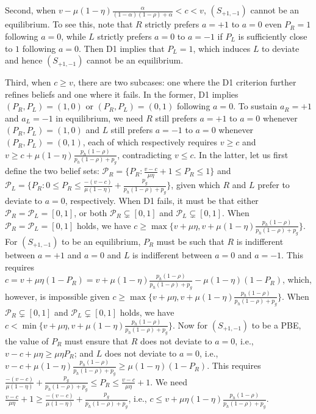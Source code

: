 \documentclass[english,12pt]{article}
\theoremstyle{plain}
\theoremstyle{plain}
\theoremstyle{definition}
\theoremstyle{definition}
\theoremstyle{assumption}
\theoremstyle{plain}
\theoremstyle{plain}
\theoremstyle{plain}
\theoremstyle{plain}
\theoremstyle{definition}%
\theoremstyle{plain}
\theoremstyle{plain}
\theoremstyle{plain}
\theoremstyle{plain}
\theoremstyle{plain}
\theoremstyle{plain}
\begin{document}
Second, when $v-\mu(1-\eta)\frac{\alpha}{(1-\alpha)(1-\rho)+\alpha}<c< v$, $(S_{+1,-1})$ cannot be an equilibrium. To see this, note that $R$ strictly prefers $a=+1$ to $a=0$ even $P_R=1$ following $a=0$, while $L$ strictly prefers $a=0$ to $a=-1$ if $P_L$ is sufficiently close to $1$ following $a=0$. Then D1 implies that $P_L=1$, which induces $L$ to deviate and hence $(S_{+1,-1})$ cannot be an equilibrium. 

Third, when $c\geq v$, there are two subcases: one where the D1 criterion further refines beliefs and one where it fails. In the former, D1 implies $(P_R,P_L)=(1,0)$ or $(P_R,P_L)=(0,1)$ following $a=0$. To sustain $a_R=+1$ and $a_L=-1$ in equilibrium, we need $R$ still prefers $a=+1$ to $a=0$ whenever $(P_R,P_L)=(1,0)$ and $L$ still prefers $a=-1$ to $a=0$ whenever $(P_R,P_L)=(0,1)$, each of which respectively requires $v\geq c$ and $v\geq c+\mu(1-\eta)\frac{p_h(1-\rho)}{p_h(1-\rho)+p_g}$, contradicting $v\leq c$. In the latter, let us first define the two belief sets: $\mathcal{P}_R= \{P_R:\frac{v-c}{\mu\eta}+1\leq P_R\leq 1\}$ and $\mathcal{P}_L = \{P_R:0\leq P_R\leq \frac{-(v-c)}{\mu(1-\eta)}+\frac{p_g}{p_h(1-\rho)+p_g}\}$, given which $R$ and $L$ prefer to deviate to $a=0$, respectively. When D1 fails, it must be that either $\mathcal{P}_R=\mathcal{P}_L=[0,1]$, or both $\mathcal{P}_R\subsetneq [0,1]$ and $\mathcal{P}_L\subsetneq [0,1]$. When $\mathcal{P}_R=\mathcal{P}_L=[0,1]$ holds, we have $c\geq \max\{v+\mu\eta, v+\mu(1-\eta)\frac{p_h(1-\rho)}{p_h(1-\rho)+p_g}\}$. For $(S_{+1,-1})$ to be an equilibrium, $P_R$ must be such that $R$ is indifferent between $a=+1$ and $a=0$ and $L$ is indifferent between $a=0$ and $a=-1$. This requires $c = v+\mu\eta(1-P_R) = v +\mu(1-\eta)\frac{p_h(1-\rho)}{p_h(1-\rho)+p_g} -\mu(1-\eta)(1-P_R)$, which, however, is impossible given $c\geq \max\{v+\mu\eta, v+\mu(1-\eta)\frac{p_h(1-\rho)}{p_h(1-\rho)+p_g}\}$. When $\mathcal{P}_R\subsetneq [0,1]$ and $\mathcal{P}_L\subsetneq [0,1]$ holds, we have $c<\min\{v+\mu\eta,v+\mu(1-\eta)\frac{p_h(1-\rho)}{p_h(1-\rho)+p_g}\}$. Now for $(S_{+1,-1})$ to be a PBE, the value of $P_R$ must ensure that $R$ does not deviate to $a=0$, i.e., $v-c+\mu\eta\geq \mu\eta P_R$; and $L$ does not deviate to $a=0$, i.e., $v-c+\mu(1-\eta)\frac{p_h(1-\rho)}{p_h(1-\rho)+p_g}\geq \mu(1-\eta)(1-P_R)$. This requires $\frac{-(v-c)}{\mu(1-\eta)}+\frac{p_g}{p_h(1-\rho)+p_g}\leq P_R\leq \frac{v-c}{\mu\eta}+1$. We need $\frac{v-c}{\mu\eta}+1\geq \frac{-(v-c)}{\mu(1-\eta)}+\frac{p_g}{p_h(1-\rho)+p_g}$, i.e., $c\leq v+\mu\eta(1-\eta)\frac{p_h(1-\rho)}{p_h(1-\rho)+p_g}$.
\end{document}
